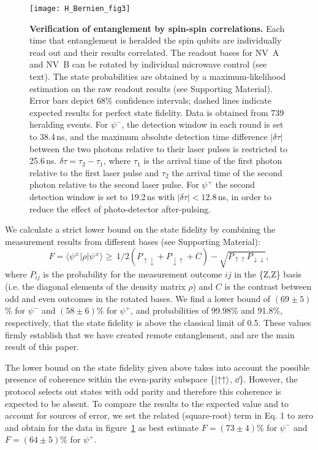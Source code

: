 \begin{figure}[tp]
	\texttt{[image: H\_Bernien\_fig3]}
	\caption{\label{fig:LDE-fig3} \textbf{Verification of entanglement by spin-spin correlations.} Each time that entanglement is heralded the spin qubits are individually read out and their results correlated. The readout bases for NV~A and NV~B can be rotated by individual microwave control (see text). The state probabilities are obtained by a maximum-likelihood estimation on the raw readout results (see Supporting Material). Error bars depict 68\% confidence intervals; dashed lines indicate expected results for perfect state fidelity. Data is obtained from 739 heralding events. For $\psi^-$, the detection window in each round is set to 38.4$\,$ns, and the maximum absolute detection time difference $|\delta\tau|$ between the two photons relative to their laser pulses is restricted to 25.6$\,$ns. $\delta\tau=\tau_2-\tau_1$, where $\tau_1$ is the arrival time of the first photon relative to the first laser pulse and $\tau_2$ the arrival time of the second photon relative to the second laser pulse. For $\psi^+$ the second detection window is set to 19.2$\,$ns with $|\delta\tau|<12.8\,$ns, in order to reduce the effect of photo-detector after-pulsing.}
\end{figure}

We calculate a strict lower bound on the state fidelity by combining the measurement results from different bases (see Supporting Material):
\begin{equation}\label{eq:LDE_LB}
F = \langle\psi^\pm|\rho|\psi^\pm \rangle \geq \ 1/2(P_{\uparrow\downarrow}+P_{\downarrow\uparrow}+C)-\sqrt{P_{\uparrow\uparrow}P_{\downarrow\downarrow}},
\end{equation}
where $P_{ij}$ is the probability for the measurement outcome $ij$ in the \{Z,Z\} basis (i.e. the diagonal elements of the density matrix $\rho$) and $C$ is the contrast between odd and even outcomes in the rotated bases. We find a lower bound of $(69\pm5)$\% for $\psi^-$ and $(58\pm6)$\% for $\psi^+$, and probabilities of 99.98\% and 91.8\%, respectively, that the state fidelity is above the classical limit of 0.5. These values firmly establish that we have created remote entanglement, and are the main result of this paper.

The lower bound on the state fidelity given above takes into account the possible presence of coherence within the even-parity subspace \{$\left|\uparrow\uparrow\right\rangle$, $\dd$\}. However, the protocol selects out states with odd parity and therefore this coherence is expected to be absent. To compare the results to the expected value and to account for sources of error, we set the related (square-root) term in Eq. 1 to zero and obtain for the data in figure~\ref{fig:LDE-fig3} as best estimate $F=(73\pm4)$\% for $\psi^-$ and $F=(64\pm5)\%$ for $\psi^+$.

